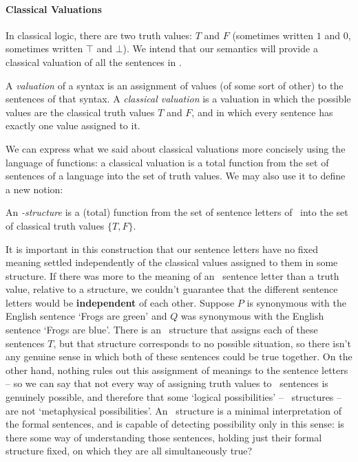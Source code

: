 \paragraph{Classical Valuations} In classical logic, there are two truth values: $T$ and $F$ (sometimes written $1$ and $0$, sometimes written $\top$ and $\bot$). We intend that our semantics will provide a classical valuation of all the sentences in \lone.
\begin{definition}[Valuation]
	A \emph{valuation} of a syntax is an assignment of values (of some sort of other) to the sentences of that syntax. A \emph{classical valuation} is a valuation in which the possible values are the classical truth values $T$ and $F$, and in which every sentence has exactly one value assigned to it.
\end{definition}
We can express what we said about classical valuations more concisely using the language of functions: a classical valuation is a total function from the set of sentences of a language into the set of truth values. We may also use it to define a new notion: 
	\begin{definition}
		An \emph{\lone-structure} is a (total) function from the set of sentence letters of \lone\ into the set of classical truth values $\{T,F\}$.
	\end{definition}

It is important in this construction that our sentence letters have no fixed meaning settled independently of the classical values assigned to them in some structure. If there was more to the meaning of an \lone\ sentence letter than a truth value, relative to a structure, we couldn't guarantee that the different sentence letters would be \textbf{independent} of each other. Suppose $P$ is synonymous with the English sentence ‘Frogs are green’ and $Q$ was synonymous with the English sentence ‘Frogs are blue’. There is an \lone\ structure that assigns each of these sentences $T$, but that structure corresponds to no possible situation, so there isn't any genuine sense in which both of these sentences could be true together. On the other hand, nothing rules out this assignment of meanings to the sentence letters – so we can say that not every way of assigning truth values to \lone\ sentences is genuinely possible, and therefore that some ‘logical possibilities’ – \lone\ structures – are not ‘metaphysical possibilities’. An \lone\ structure is a minimal interpretation of the formal sentences, and is capable of detecting possibility only in this sense: is there some way of understanding those sentences, holding just their formal structure fixed, on which they are all simultaneously true? 

